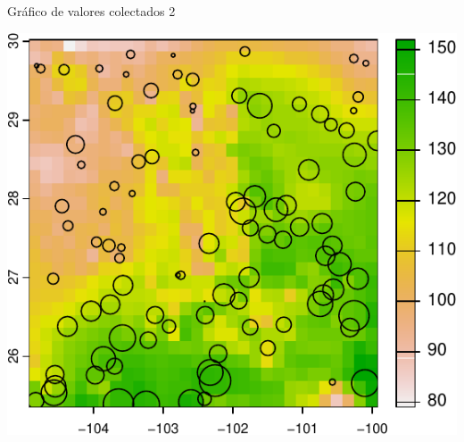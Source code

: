 \documentclass[
  11pt,
  ignorenonframetext,
]{beamer}
\newenvironment{Shaded}{}{}
\newcommand{\AttributeTok}[1]{\textcolor[rgb]{0.49,0.56,0.16}{#1}}
\newcommand{\DecValTok}[1]{\textcolor[rgb]{0.25,0.63,0.44}{#1}}
\newcommand{\FunctionTok}[1]{\textcolor[rgb]{0.02,0.16,0.49}{#1}}
\newcommand{\NormalTok}[1]{#1}
\newcommand{\SpecialCharTok}[1]{\textcolor[rgb]{0.25,0.44,0.63}{#1}}
\newcommand{\StringTok}[1]{\textcolor[rgb]{0.25,0.44,0.63}{#1}}
\begin{document}
\begin{frame}[fragile]{Gráfico de valores colectados 2}
\protect\hypertarget{gruxe1fico-de-valores-colectados-2}{}
\begin{Shaded}
\end{Shaded}

\includegraphics{Correlacion-espacial_files/figure-beamer/unnamed-chunk-9-1.pdf}
\end{frame}
\end{document}
